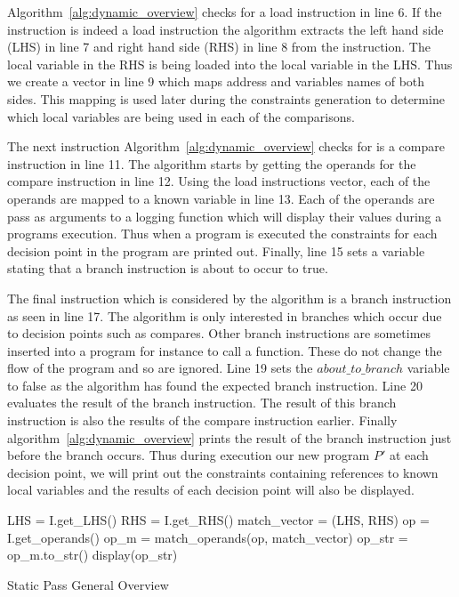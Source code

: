 Algorithm~\ref{alg:dynamic_overview} checks for a load instruction in line 6. If the instruction is indeed a load instruction the algorithm extracts the left hand side (LHS) in line 7 and right hand side (RHS) in line 8 from the instruction. The local variable in the RHS is being loaded into the local variable in the LHS. Thus we create a vector in line 9 which maps address and variables names of both sides. This mapping is used later during the constraints generation to determine which local variables are being used in each of the comparisons.

The next instruction Algorithm~\ref{alg:dynamic_overview} checks for is a compare instruction in line 11. The algorithm starts by getting the operands for the compare instruction in line 12. Using the load instructions vector, each of the operands are mapped to a known variable in line 13. Each of the operands are pass as arguments to a logging function which will display their values during a programs execution. Thus when a program is executed the constraints for each decision point in the program are printed out. Finally, line 15 sets a variable stating that a branch instruction is about to occur to true. 

The final instruction which is considered by the algorithm is a branch instruction as seen in line 17. The algorithm is only interested in branches which occur due to decision points such as compares. Other branch instructions are sometimes inserted into a program for instance to call a function. These do not change the flow of the program and so are ignored. Line 19 sets the $about\_to\_branch$ variable to false as the algorithm has found the expected branch instruction. Line 20 evaluates the result of the branch instruction. The result of this branch instruction is also the results of the compare instruction earlier. Finally algorithm~\ref{alg:dynamic_overview} prints the result of the branch instruction just before the branch occurs. Thus during execution our new program $P'$ at each decision point, we will print out the constraints containing references to known local variables and the results of each decision point will also be displayed.

\begin{algorithm}[t]
    \SetAlgoLined

    {
        {
            {
                {
                    LHS = I.get\_LHS()\;
                    RHS = I.get\_RHS()\;
                    match\_vector = (LHS, RHS)\;
                }
                {
                    op = I.get\_operands()\;
                    op\_m = match\_operands(op, match\_vector)\;
                    op\_str = op\_m.to\_str()\;
                    display(op\_str)\;
                }
            }
        }
    }
 \caption{Static Pass General Overview}
 \label{alg:static_overview}
\end{algorithm}

